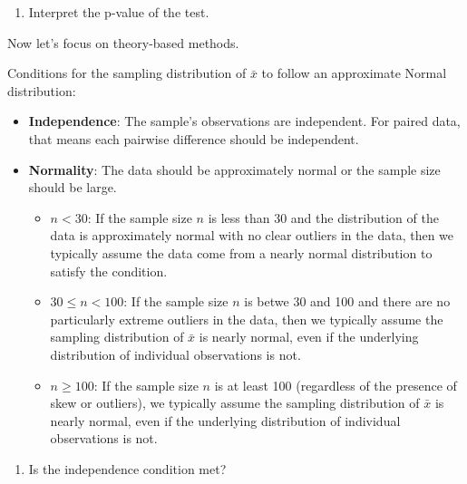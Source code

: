 \documentclass[
]{report}
\providecommand{\tightlist}{%
  \setlength{\itemsep}{0pt}\setlength{\parskip}{0pt}}
\begin{document}
\begin{enumerate}
\def\labelenumi{\arabic{enumi}.}
\setcounter{enumi}{7}
\tightlist
\item
  Interpret the p-value of the test.
\end{enumerate}

\vspace{1in}

Now let's focus on theory-based methods.

Conditions for the sampling distribution of \(\bar{x}\) to follow an approximate Normal distribution:

\begin{itemize}
\item
  \textbf{Independence}: The sample's observations are independent. For paired data, that means each pairwise difference should be independent.
\item
  \textbf{Normality}: The data should be approximately normal or the sample size should be large.

  \begin{itemize}
  \item
    \(n < 30\): If the sample size \(n\) is less than 30 and the distribution of the data is approximately normal with no clear outliers in the data, then we typically assume the data come from a nearly normal distribution to satisfy the condition.
  \item
    \(30 \leq n < 100\): If the sample size \(n\) is betwe 30 and 100 and there are no particularly extreme outliers in the data, then we typically assume the sampling distribution of \(\bar{x}\) is nearly normal, even if the underlying distribution of individual observations is not.
  \item
    \(n \geq 100\): If the sample size \(n\) is at least 100 (regardless of the presence of skew or outliers), we typically assume the sampling distribution of \(\bar{x}\) is nearly normal, even if the underlying distribution of individual observations is not.
  \end{itemize}
\end{itemize}

\begin{enumerate}
\def\labelenumi{\arabic{enumi}.}
\setcounter{enumi}{8}
\tightlist
\item
  Is the independence condition met?
\end{enumerate}

\vspace{0.5in}
\end{document}
